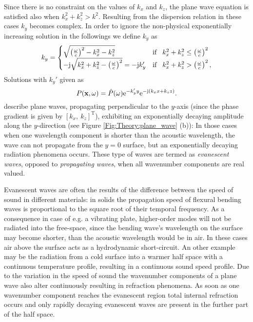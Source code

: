Since there is no constraint on the values of $k_x$ and $k_z$, the plane wave equation is satisfied also when $k_x^2 + k_z^2 > k^2$. Resulting from the dispersion relation in these cases $k_y$ becomes complex.
In order to ignore the non-physical exponentially increasing solution in the followings we define $k_y$ as 
\begin{equation}
k_y = \begin{cases}
                       \sqrt{\left(\frac{\omega}{c}\right)^2 - k_x^2 - k_z^2}  & \text{if} \hspace{3mm} k_x^2 + k_z^2 \leq \left(\frac{\omega}{c}\right)^2\\
                      -\mathrm{j} \sqrt{k_x^2+k_z^2 - \left(\frac{\omega}{c}\right)^2 } = -\mathrm{j} k_y' &  \text{if} \hspace{3mm} k_x^2 + k_z^2 > \left(\frac{\omega}{c}\right)^2,
                 \end{cases}
\label{eq:theory:k_y_definition}
\end{equation}
Solutions with $k_y'$ given as
 \begin{equation}
 P(\mathbf{x},\omega) = \hat{P}(\omega) \mathrm{e}^{-k_y' y} \mathrm{e}^{-\mathrm{j} \left( k_x x + k_z z \right) }.
 \end{equation}
describe plane waves, propagating perpendicular to the $y$-axis (since the phase gradient is given by $[k_x,\ k_z]^{\mathrm{T}}$), exhibiting an exponentially decaying amplitude along the $y$-direction (see Figure \ref{Fig:Theory:plane_wave} (b)):
In those cases when one wavelength component is shorter than the acoustic wavelength, the wave can not propagate from the $y = 0$ surface, but an exponentially decaying radiation phenomena occurs.
These type of waves are termed as \emph{evanescent waves}, opposed to \emph{propagating waves}, when all wavenumber components are real valued.
 
%
Evanescent waves are often the results of the difference between the speed of sound in different materials: in solids the propagation speed of flexural bending waves is proportional to the square root of their temporal frequency. 
As a consequence in case of e.g. a vibrating plate, higher-order modes will not be radiated into the free-space, since the bending wave's wavelength on the surface may become shorter, than the acoustic wavelength would be in air. 
In these cases air above the surface acts as a hydrodynamic short-circuit.
An other example may be the radiation from a cold surface into a warmer half space with a continuous temperature profile, resulting in a continuous sound speed profile.
Due to the variation in the speed of sound the wavenumber components of a plane wave also alter continuously resulting in refraction phenomena.
As soon as one wavenumber component reaches the evanescent region total internal refraction occurs and only rapidly decaying evanescent waves are present in the further part of the half space.

